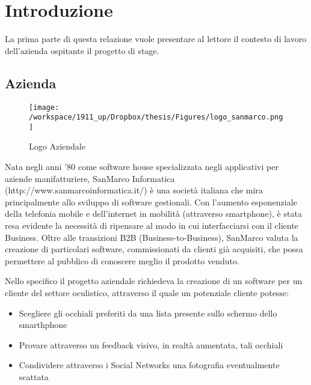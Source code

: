
\chapter{Introduzione} %

\label{Chapter1} %


La prima parte di questa relazione vuole presentare al lettore il contesto di lavoro dell'azienda ospitante il progetto di stage.



\section{Azienda}
\begin{figure}[h]\centering  
\texttt{[image: /workspace/1911\_up/Dropbox/thesis/Figures/logo\_sanmarco.png]}
\caption[Logo Aziendale]{Logo Aziendale}
\label{pic-a}
\end{figure}

Nata negli anni '80 come software house specializzata negli applicativi per aziende manifatturiere, SanMarco Informatica (http://www.sanmarcoinformatica.it/) è una società italiana che mira principalmente allo sviluppo di software gestionali. Con l'aumento esponenziale della telefonia mobile e dell'internet in mobilità (attraverso smartphone), è stata resa evidente la necessità di ripensare al modo in cui interfacciarsi con il cliente Business. Oltre alle transizioni B2B (Business-to-Business), SanMarco valuta la creazione di particolari software, commissionati da clienti già acquisiti, che possa permettere al pubblico di conoscere meglio il prodotto venduto. 

Nello specifico il progetto aziendale richiedeva la creazione di un software per un cliente del settore oculistico, attraverso il quale un potenziale cliente potesse:

\begin{itemize}
\item Scegliere gli occhiali preferiti da una lista presente sullo schermo dello smarthphone
\item Provare attraverso un feedback visivo, in realtà aumentata, tali occhiali
\item Condividere attraverso i Social Networks una fotografia eventualmente scattata
\end{itemize}

